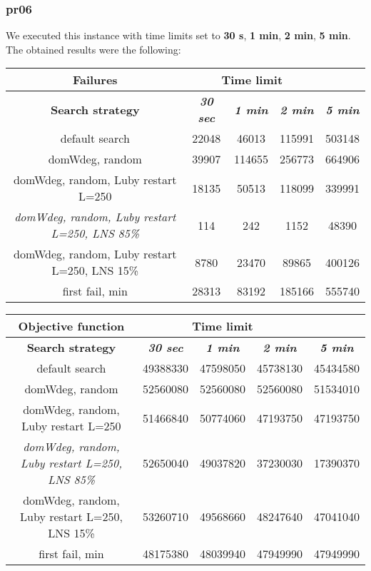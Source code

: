 \subsubsection{pr06}
We executed this instance with time limits set to \textbf{30 s}, \textbf{1 min}, \textbf{2 min}, \textbf{5 min}.\\
The obtained results were the following:
{
\renewcommand{\arraystretch}{2}
\begin{longtable}[h]{| c | c | c | c | c |}
    \hline
    \textbf{Failures} & \multicolumn{3}{c}{Time limit} & \\
    \hline
    \textbf{Search strategy} & \textbf{\textit{30 sec}} & \textbf{\textit{1 min}} & \textbf{\textit{2 min}} & \textbf{\textit{5 min}} \\
    \hline
    \endhead
    default search                                         & 22048 &  46013 & 115991 & 503148 \\
    \hline
    domWdeg, random                                        & 39907 & 114655 & 256773 & 664906 \\
    \hline
    domWdeg, random, Luby restart L=250                    & 18135 &  50513 & 118099 & 339991 \\
    \hline
    \textit{domWdeg, random, Luby restart L=250, LNS 85\%} &   114 &    242 &   1152 &  48390 \\
    \hline
    domWdeg, random, Luby restart L=250, LNS 15\%          &  8780 &  23470 &  89865 & 400126 \\
    \hline
    first fail, min                                        & 28313 &  83192 & 185166 & 555740 \\
    \hline
\end{longtable}
}

{
\renewcommand{\arraystretch}{2}
\begin{longtable}[h]{| c | c | c | c | c |}
    \hline
    \textbf{Objective function} & \multicolumn{3}{c}{Time limit} & \\
    \hline
    \textbf{Search strategy} & \textbf{\textit{30 sec}} & \textbf{\textit{1 min}} & \textbf{\textit{2 min}} & \textbf{\textit{5 min}} \\
    \hline
    \endhead
    default search                                         & 49388330 & 47598050 & 45738130 & 45434580 \\
    \hline
    domWdeg, random                                        & 52560080 & 52560080 & 52560080 & 51534010 \\
    \hline
    domWdeg, random, Luby restart L=250                    & 51466840 & 50774060 & 47193750 & 47193750 \\
    \hline
    \textit{domWdeg, random, Luby restart L=250, LNS 85\%} & 52650040 & 49037820 & 37230030 & 17390370 \\
    \hline
    domWdeg, random, Luby restart L=250, LNS 15\%          & 53260710 & 49568660 & 48247640 & 47041040 \\
    \hline
    first fail, min                                        & 48175380 & 48039940 & 47949990 & 47949990 \\
    \hline
\end{longtable}
}